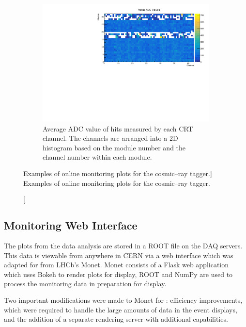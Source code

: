 \begin{figure}
	\begin{subfigure}[b]{0.8\textwidth}
		\centering
		\vspace{3mm}
		\includegraphics[width=\textwidth]{figures/crt_adc_om.pdf}
		\caption {Average ADC value of hits measured by each CRT channel. The 
		channels are arranged into a 2D histogram based on the module number and the 
		channel number within each module.}
		\label{fig:crt_adc_om}
	\end{subfigure}

	\caption
	[Examples of online monitoring plots for the cosmic--ray tagger.]
	{Examples of online monitoring plots for the cosmic--ray tagger.}
	\label{fig:crt_OM}

\end{figure}

\subsection{Monitoring Web Interface}
The plots from the data analysis are stored in a ROOT file on the \protodune{}
DAQ servers. This data is viewable from anywhere in CERN via a web interface
which was adapted for \protodune{} from LHCb's Monet\cite{Adinolfi_2017}. 
Monet consists of a Flask web application\cite{flask} which uses 
Bokeh\cite{bokeh} to render plots for display, ROOT\cite{ANTCHEVA20092499} and 
NumPy\cite{numpy} are used to process the monitoring data in preparation for 
display.

Two important modifications were made to Monet for \protodune{}: efficiency 
improvements, which were required to handle the large amounts of data in the 
event displays, and the addition of a separate rendering server with 
additional capabilities. 

